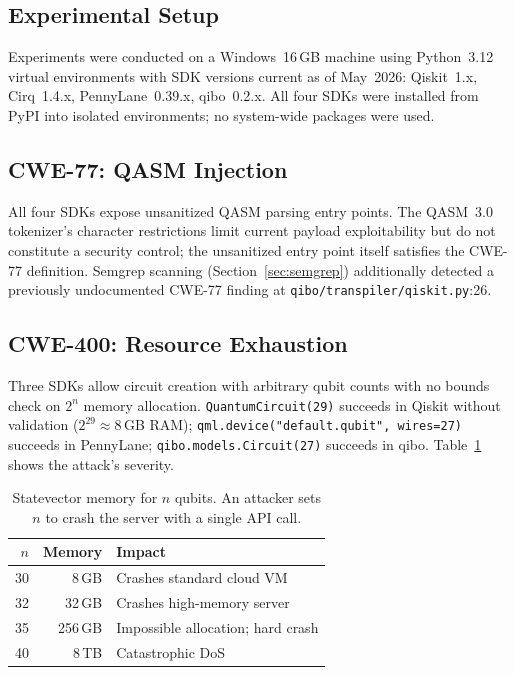 \documentclass[conference,compsoc]{IEEEtran}
\begin{document}
\subsection{Experimental Setup}
\noindent Experiments were conducted on a Windows~16\,GB machine using
Python~3.12 virtual environments with SDK versions current as of
May~2026: Qiskit~1.x, Cirq~1.4.x, PennyLane~0.39.x, qibo~0.2.x.
All four SDKs were installed from PyPI into isolated environments;
no system-wide packages were used.

\subsection{CWE-77: QASM Injection}
\noindent All four SDKs expose unsanitized QASM parsing entry points.
The QASM~3.0 tokenizer's character restrictions limit current payload
exploitability but do not constitute a security control; the
unsanitized entry point itself satisfies the CWE-77 definition.
Semgrep scanning (Section~\ref{sec:semgrep}) additionally detected a
previously undocumented CWE-77 finding at
\texttt{qibo/transpiler/qiskit.py}:26.

\subsection{CWE-400: Resource Exhaustion}
\noindent Three SDKs allow circuit creation with arbitrary qubit counts with no
bounds check on $2^n$ memory allocation.
\texttt{QuantumCircuit(29)} succeeds in Qiskit without validation
($2^{29} \approx 8$\,GB RAM);
\texttt{qml.device("default.qubit",~wires=27)} succeeds in PennyLane;
\texttt{qibo.models.Circuit(27)} succeeds in qibo.
Table~\ref{tab:qubit_ram} shows the attack's severity.

\begin{table}[!ht]
\centering
\caption{Statevector memory for $n$ qubits.
An attacker sets $n$ to crash the server with a single API call.}
\label{tab:qubit_ram}
\begin{tabular}{rrl}
\toprule
$n$ & Memory & Impact \\
\midrule
30 & 8\,GB   & Crashes standard cloud VM \\
32 & 32\,GB  & Crashes high-memory server \\
35 & 256\,GB & Impossible allocation; hard crash \\
40 & 8\,TB   & Catastrophic DoS \\
\bottomrule
\end{tabular}
\end{table}
\end{document}
